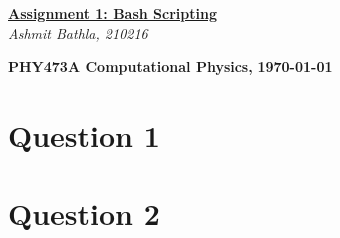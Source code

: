 \documentclass[12 pt]{article}
\begin{document}

\thispagestyle{empty}
\vspace*{.5 cm}

\begin{center} 
\Large \textbf{\underline{Assignment 1: Bash Scripting}}
\\

\vspace{ 0.7 cm }
\normalsize \textit{Ashmit Bathla, 210216}\\
\end{center}
\begingroup 
\begin{center}
     \textbf{PHY473A Computational Physics,}
    \textbf{\today}
\end{center}
\vspace{1cm}
\parindent 0pt

\endgroup


\section*{\sffamily Question 1}



\section*{\sffamily Question 2}

% 
% 
\end{document}
